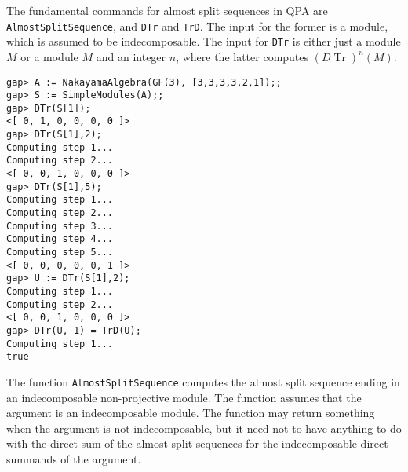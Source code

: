 \documentclass{amsart}
\newcommand{\Tr}{\operatorname{Tr}\nolimits}
\theoremstyle{definition}
\newcommand{\code}[1]{\texttt{#1}}
\theoremstyle{theoretic}
\begin{document}
\sloppypar The fundamental commands for almost split sequences in QPA are
\code{AlmostSplitSequence}, and \code{DTr} and \code{TrD}.  The input
for the former is a module, which is assumed to be indecomposable.
The input for \code{DTr} is either just a module $M$ or a module $M$
and an integer $n$, where the latter computes $(D\Tr)^n(M)$.  
\begin{verbatim}
gap> A := NakayamaAlgebra(GF(3), [3,3,3,3,2,1]);;
gap> S := SimpleModules(A);;
gap> DTr(S[1]);
<[ 0, 1, 0, 0, 0, 0 ]>
gap> DTr(S[1],2);
Computing step 1...
Computing step 2...
<[ 0, 0, 1, 0, 0, 0 ]>
gap> DTr(S[1],5);
Computing step 1...
Computing step 2...
Computing step 3...
Computing step 4...
Computing step 5...
<[ 0, 0, 0, 0, 0, 1 ]>
gap> U := DTr(S[1],2);
Computing step 1...
Computing step 2...
<[ 0, 0, 1, 0, 0, 0 ]>
gap> DTr(U,-1) = TrD(U);   
Computing step 1...
true
\end{verbatim}
The function \code{AlmostSplitSequence} computes the almost split
sequence ending in an indecomposable non-projective module.  The 
function assumes that the argument is an indecomposable module.  The
function may return something when the argument is not indecomposable,
but it need not to have anything to do with the direct sum of the almost split
sequences for the indecomposable direct summands of the argument. 
\end{document}
